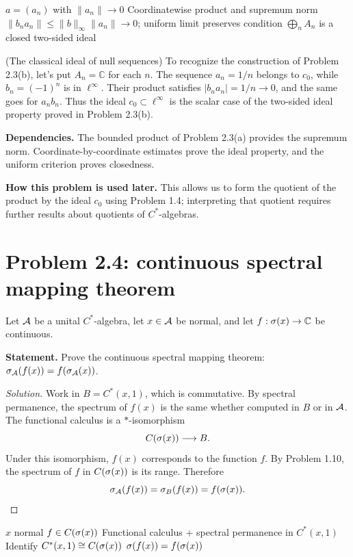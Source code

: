 \proofdiagram
{$a=(a_n)$ with $\|a_n\|\to0$}
{Coordinatewise product and supremum norm}
{$\|b_na_n\|\le\|b\|_\infty\|a_n\|\to0$; uniform limit preserves condition}
{$\bigoplus_n A_n$ is a closed two-sided ideal}

\begin{cthejemplo}{(The classical ideal of null sequences)}
To recognize the construction of Problem 2.3(b), let's put $A_n=\mathbb C$ for each $n$.
The sequence $a_n=1/n$ belongs to $c_0$, while $b_n=(-1)^n$ is in $\ell^\infty$.
Their product satisfies $|b_na_n|=1/n\to0$, and the same goes for $a_nb_n$.
Thus the ideal $c_0\subset\ell^\infty$ is the scalar case of the two-sided ideal property proved in Problem 2.3(b).
\end{cthejemplo}

\noindent\textbf{Dependencies.} The bounded product of Problem 2.3(a) provides the supremum norm. Coordinate-by-coordinate estimates prove the ideal property, and the uniform criterion proves closedness.

\noindent\textbf{How this problem is used later.} This allows us to form the quotient of the product by the ideal $c_0$ using Problem 1.4; interpreting that quotient requires further results about quotients of $C^*$-algebras.

\section{Problem 2.4: continuous spectral mapping theorem}

Let $\mathcal A$ be a unital $C^*$-algebra, let $x\in\mathcal A$ be normal, and let $f:\sigma(x)\to\mathbb C$ be continuous.

\noindent\textbf{Statement.} Prove the continuous spectral mapping theorem: $\sigma_\mathcal A(f(x))=f(\sigma_\mathcal A(x))$.

\begin{proof}[Solution]
Work in $B=C^*(x,1)$, which is commutative. By spectral permanence, the spectrum of
$f(x)$ is the same whether computed in $B$ or in $\mathcal A$. The functional calculus is a $*$-isomorphism
\[
 C(\sigma(x))\longrightarrow B.
\]
Under this isomorphism, $f(x)$ corresponds to the function $f$. By Problem 1.10, the
spectrum of $f$ in $C(\sigma(x))$ is its range. Therefore
\[
 \sigma_\mathcal A(f(x))=\sigma_B(f(x))=f(\sigma(x)).
\]
\end{proof}

\proofdiagrambranch
{$x$ normal}
{$f\in C(\sigma(x))$}
{Functional calculus + spectral permanence in $C^*(x,1)$}
{Identify $C^*(x,1)\cong C(\sigma(x))$}
{$\sigma(f(x))=f(\sigma(x))$}

